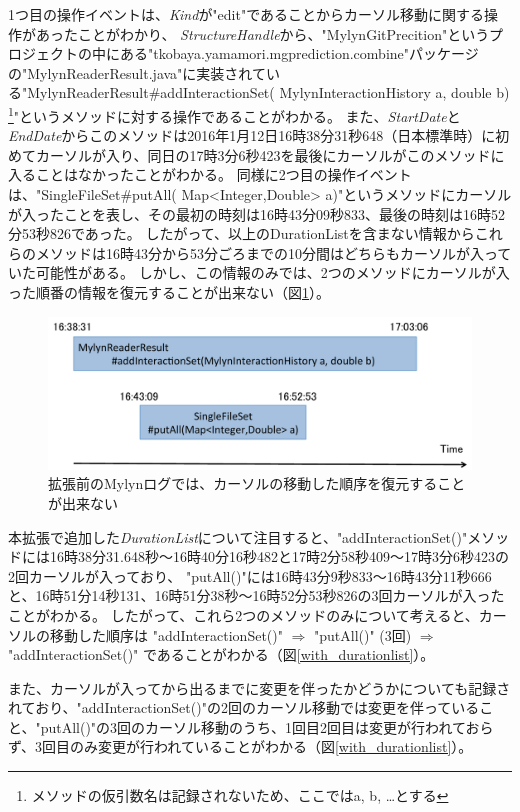 \documentclass[a4paper]{jsbook}
\begin{document}
{1つ目の操作イベントは、{\it Kind}が"edit"であることからカーソル移動に関する操作があったことがわかり、
{\it StructureHandle}から、"MylynGitPrecition"というプロジェクトの中にある"tkobaya.yamamori.mgprediction.combine"パッケージの"MylynReaderResult.java"に実装されている"MylynReaderResult\#addInteractionSet( MylynInteractionHistory a, double b)
\footnote{メソッドの仮引数名は記録されないため、ここではa, b, \dots とする}"というメソッドに対する操作であることがわかる。
また、{\it StartDate}と{\it EndDate}からこのメソッドは2016年1月12日16時38分31秒648（日本標準時）に初めてカーソルが入り、同日の17時3分6秒423を最後にカーソルがこのメソッドに入ることはなかったことがわかる。
同様に2つ目の操作イベントは、"SingleFileSet\#putAll( Map<Integer,Double> a)"というメソッドにカーソルが入ったことを表し、その最初の時刻は16時43分09秒833、最後の時刻は16時52分53秒826であった。
したがって、以上のDurationListを含まない情報からこれらのメソッドは16時43分から53分ごろまでの10分間はどちらもカーソルが入っていた可能性がある。
しかし、この情報のみでは、2つのメソッドにカーソルが入った順番の情報を復元することが出来ない（図\ref{only_startdate_enddate}）。

\begin{figure}[tb]
  \centering
  \includegraphics[width = \linewidth]{resource/only_startdate_enddate.pdf}
  \caption{拡張前のMylynログでは、カーソルの移動した順序を復元することが出来ない}
  \label{only_startdate_enddate}
\end{figure}


本拡張で追加した{\it DurationList}について注目すると、"addInteractionSet()"メソッドには16時38分31.648秒〜16時40分16秒482と17時2分58秒409〜17時3分6秒423の2回カーソルが入っており、
"putAll()"には16時43分9秒833〜16時43分11秒666と、16時51分14秒131、16時51分38秒〜16時52分53秒826の3回カーソルが入ったことがわかる。
したがって、これら2つのメソッドのみについて考えると、カーソルの移動した順序は
"addInteractionSet()" $\Rightarrow$
"putAll()" (3回) $\Rightarrow$
"addInteractionSet()"
であることがわかる（図\ref{with_durationlist}）。

また、カーソルが入ってから出るまでに変更を伴ったかどうかについても記録されており、"addInteractionSet()"の2回のカーソル移動では変更を伴っていること、"putAll()"の3回のカーソル移動のうち、1回目2回目は変更が行われておらず、3回目のみ変更が行われていることがわかる（図\ref{with_durationlist}）。

}
\end{document}
